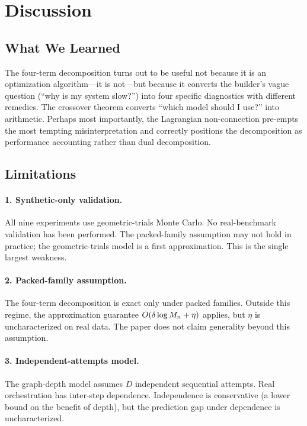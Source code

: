 \section{Discussion}
\label{sec:discussion}

\subsection{What We Learned}

The four-term decomposition turns out to be useful not because it is an optimization algorithm---it is not---but because it converts the builder's vague question (``why is my system slow?'') into four specific diagnostics with different remedies.
The crossover theorem converts ``which model should I use?'' into arithmetic.
Perhaps most importantly, the Lagrangian non-connection pre-empts the most tempting misinterpretation and correctly positions the decomposition as performance accounting rather than dual decomposition.

\subsection{Limitations}

\paragraph{1. Synthetic-only validation.}
All nine experiments use geometric-trials Monte Carlo.
No real-benchmark validation has been performed.
The packed-family assumption may not hold in practice; the geometric-trials model is a first approximation.
This is the single largest weakness.

\paragraph{2. Packed-family assumption.}
The four-term decomposition is exact only under packed families.
Outside this regime, the approximation guarantee $O(\delta \log M_n + \eta)$ applies, but $\eta$ is uncharacterized on real data.
The paper does not claim generality beyond this assumption.

\paragraph{3. Independent-attempts model.}
The graph-depth model assumes $D$ independent sequential attempts.
Real orchestration has inter-step dependence.
Independence is conservative (a lower bound on the benefit of depth), but the prediction gap under dependence is uncharacterized.

